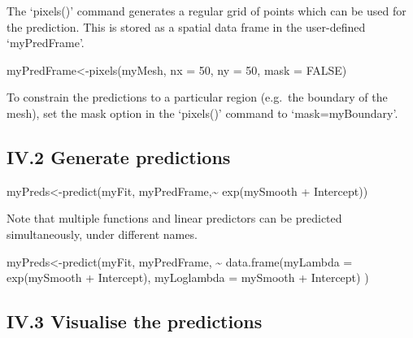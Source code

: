 \documentclass[
]{article}
\newenvironment{Shaded}{\begin{snugshade}}{\end{snugshade}}
\newcommand{\AttributeTok}[1]{\textcolor[rgb]{0.77,0.63,0.00}{#1}}
\newcommand{\ConstantTok}[1]{\textcolor[rgb]{0.00,0.00,0.00}{#1}}
\newcommand{\DecValTok}[1]{\textcolor[rgb]{0.00,0.00,0.81}{#1}}
\newcommand{\FunctionTok}[1]{\textcolor[rgb]{0.00,0.00,0.00}{#1}}
\newcommand{\NormalTok}[1]{#1}
\newcommand{\OtherTok}[1]{\textcolor[rgb]{0.56,0.35,0.01}{#1}}
\newcommand{\SpecialCharTok}[1]{\textcolor[rgb]{0.00,0.00,0.00}{#1}}
\begin{document}
The `pixels()' command generates a regular grid of points which can be
used for the prediction. This is stored as a spatial data frame in the
user-defined `myPredFrame'.

\begin{Shaded}
\begin{Highlighting}[]
\NormalTok{myPredFrame}\OtherTok{\textless{}{-}}\FunctionTok{pixels}\NormalTok{(myMesh, }\AttributeTok{nx =} \DecValTok{50}\NormalTok{, }\AttributeTok{ny =} \DecValTok{50}\NormalTok{, }\AttributeTok{mask =} \ConstantTok{FALSE}\NormalTok{)}
\end{Highlighting}
\end{Shaded}

To constrain the predictions to a particular region (e.g.~the boundary
of the mesh), set the mask option in the `pixels()' command to
`mask=myBoundary'.

\hypertarget{iv.2-generate-predictions}{%
\subsection{IV.2 Generate predictions}\label{iv.2-generate-predictions}}

\begin{Shaded}
\begin{Highlighting}[]
\NormalTok{myPreds}\OtherTok{\textless{}{-}}\FunctionTok{predict}\NormalTok{(myFit, myPredFrame,}\SpecialCharTok{\textasciitilde{}} \FunctionTok{exp}\NormalTok{(mySmooth }\SpecialCharTok{+}\NormalTok{ Intercept))}
\end{Highlighting}
\end{Shaded}

Note that multiple functions and linear predictors can be predicted
simultaneously, under different names.

\begin{Shaded}
\begin{Highlighting}[]
\NormalTok{myPreds}\OtherTok{\textless{}{-}}\FunctionTok{predict}\NormalTok{(myFit, myPredFrame,  }
                 \SpecialCharTok{\textasciitilde{}} \FunctionTok{data.frame}\NormalTok{(}\AttributeTok{myLambda =} \FunctionTok{exp}\NormalTok{(mySmooth }\SpecialCharTok{+}\NormalTok{ Intercept),}
                              \AttributeTok{myLoglambda =}\NormalTok{ mySmooth }\SpecialCharTok{+}\NormalTok{ Intercept)}
\NormalTok{                )}
\end{Highlighting}
\end{Shaded}

\hypertarget{iv.3-visualise-the-predictions}{%
\subsection{IV.3 Visualise the
predictions}\label{iv.3-visualise-the-predictions}}
\end{document}
